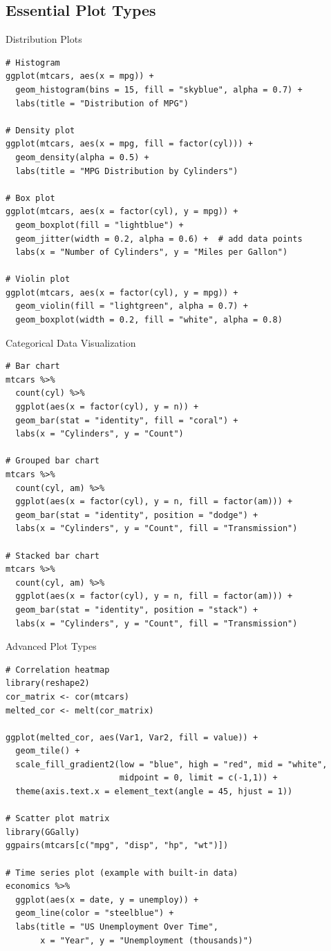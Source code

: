 \documentclass[aspectratio=169]{beamer}
\begin{document}
\subsection{Essential Plot Types}

\begin{frame}[fragile]{Distribution Plots}
\begin{lstlisting}
# Histogram
ggplot(mtcars, aes(x = mpg)) +
  geom_histogram(bins = 15, fill = "skyblue", alpha = 0.7) +
  labs(title = "Distribution of MPG")

# Density plot
ggplot(mtcars, aes(x = mpg, fill = factor(cyl))) +
  geom_density(alpha = 0.5) +
  labs(title = "MPG Distribution by Cylinders")

# Box plot
ggplot(mtcars, aes(x = factor(cyl), y = mpg)) +
  geom_boxplot(fill = "lightblue") +
  geom_jitter(width = 0.2, alpha = 0.6) +  # add data points
  labs(x = "Number of Cylinders", y = "Miles per Gallon")

# Violin plot
ggplot(mtcars, aes(x = factor(cyl), y = mpg)) +
  geom_violin(fill = "lightgreen", alpha = 0.7) +
  geom_boxplot(width = 0.2, fill = "white", alpha = 0.8)
\end{lstlisting}
\end{frame}

\begin{frame}[fragile]{Categorical Data Visualization}
\begin{lstlisting}
# Bar chart
mtcars %>%
  count(cyl) %>%
  ggplot(aes(x = factor(cyl), y = n)) +
  geom_bar(stat = "identity", fill = "coral") +
  labs(x = "Cylinders", y = "Count")

# Grouped bar chart
mtcars %>%
  count(cyl, am) %>%
  ggplot(aes(x = factor(cyl), y = n, fill = factor(am))) +
  geom_bar(stat = "identity", position = "dodge") +
  labs(x = "Cylinders", y = "Count", fill = "Transmission")

# Stacked bar chart
mtcars %>%
  count(cyl, am) %>%
  ggplot(aes(x = factor(cyl), y = n, fill = factor(am))) +
  geom_bar(stat = "identity", position = "stack") +
  labs(x = "Cylinders", y = "Count", fill = "Transmission")
\end{lstlisting}
\end{frame}

\begin{frame}[fragile]{Advanced Plot Types}
\begin{lstlisting}
# Correlation heatmap
library(reshape2)
cor_matrix <- cor(mtcars)
melted_cor <- melt(cor_matrix)

ggplot(melted_cor, aes(Var1, Var2, fill = value)) +
  geom_tile() +
  scale_fill_gradient2(low = "blue", high = "red", mid = "white",
                       midpoint = 0, limit = c(-1,1)) +
  theme(axis.text.x = element_text(angle = 45, hjust = 1))

# Scatter plot matrix
library(GGally)
ggpairs(mtcars[c("mpg", "disp", "hp", "wt")])

# Time series plot (example with built-in data)
economics %>%
  ggplot(aes(x = date, y = unemploy)) +
  geom_line(color = "steelblue") +
  labs(title = "US Unemployment Over Time",
       x = "Year", y = "Unemployment (thousands)")
\end{lstlisting}
\end{frame}
\end{document}
